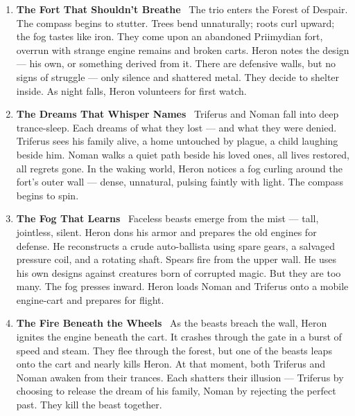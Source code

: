 \documentclass[9pt]{article}
\begin{document}
\begin{center}
\begin{enumerate}

\item \textbf{The Fort That Shouldn’t Breathe} \
The trio enters the Forest of Despair. The compass begins to stutter. Trees bend unnaturally; roots curl upward; the fog tastes like iron. They come upon an abandoned Priimydian fort, overrun with strange engine remains and broken carts. Heron notes the design — his own, or something derived from it. There are defensive walls, but no signs of struggle — only silence and shattered metal. They decide to shelter inside. As night falls, Heron volunteers for first watch.

\vspace{.3in}

\item \textbf{The Dreams That Whisper Names} \
Triferus and Noman fall into deep trance-sleep. Each dreams of what they lost — and what they were denied. Triferus sees his family alive, a home untouched by plague, a child laughing beside him. Noman walks a quiet path beside his loved ones, all lives restored, all regrets gone. In the waking world, Heron notices a fog curling around the fort’s outer wall — dense, unnatural, pulsing faintly with light. The compass begins to spin.

\vspace{.3in}

\item \textbf{The Fog That Learns} \
Faceless beasts emerge from the mist — tall, jointless, silent. Heron dons his armor and prepares the old engines for defense. He reconstructs a crude auto-ballista using spare gears, a salvaged pressure coil, and a rotating shaft. Spears fire from the upper wall. He uses his own designs against creatures born of corrupted magic. But they are too many. The fog presses inward. Heron loads Noman and Triferus onto a mobile engine-cart and prepares for flight.

\vspace{.3in}

\item \textbf{The Fire Beneath the Wheels} \
As the beasts breach the wall, Heron ignites the engine beneath the cart. It crashes through the gate in a burst of speed and steam. They flee through the forest, but one of the beasts leaps onto the cart and nearly kills Heron. At that moment, both Triferus and Noman awaken from their trances. Each shatters their illusion — Triferus by choosing to release the dream of his family, Noman by rejecting the perfect past. They kill the beast together.


\end{enumerate}
\end{center}
\end{document}
